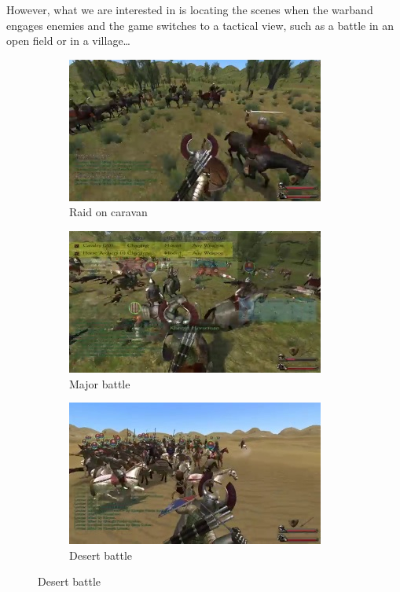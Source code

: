 \documentclass[
]{article}
\begin{document}
However, what we are interested in is locating the scenes when the
warband engages enemies and the game switches to a tactical view, such
as a battle in an open field or in a village\ldots{}

\begin{figure}[H]
	\centering
	\begin{subfigure}[b]{0.3\textwidth}
		\includegraphics[width=\linewidth]{docimages/E_0060_00_44_20.jpg}
		\caption{Raid on caravan}
	\end{subfigure}
	\begin{subfigure}[b]{0.3\textwidth}
		\includegraphics[width=\linewidth]{docimages/E_0066_01_21_18.jpg}
		\caption{Major battle}
	\end{subfigure}
	\begin{subfigure}[b]{0.3\textwidth}
		\includegraphics[width=\linewidth]{docimages/E_0065_00_29_08.jpg}
		\caption{Desert battle}
	\end{subfigure}
\end{figure}
\end{document}

